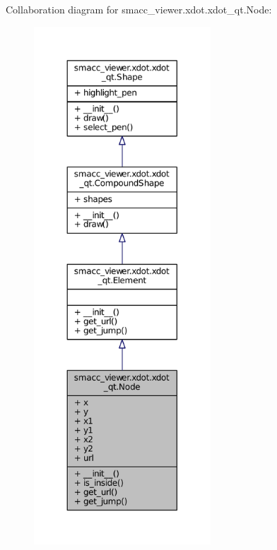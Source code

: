 Collaboration diagram for smacc\+\_\+viewer.\+xdot.\+xdot\+\_\+qt.\+Node\+:
\nopagebreak
\begin{figure}[H]
\begin{center}
\leavevmode
\includegraphics[height=550pt]{classsmacc__viewer_1_1xdot_1_1xdot__qt_1_1Node__coll__graph}
\end{center}
\end{figure}
